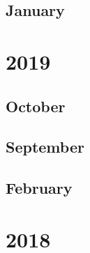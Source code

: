 \documentclass[12pt]{article}
\begin{document}
\subsection{January}
\begin{refsection}
    \nocite{raffel_exploring_2020}
    \nocite{kaplan2020scalinglawsneurallanguage}
    \printbibliography[heading=none]
\end{refsection}


\newpage
\section{2019}
\subsection{October}
\begin{refsection}
    \nocite{raffel_exploring_2020}
    \nocite{rajbhandari_zero_2020}
    \printbibliography[heading=none]
\end{refsection}

\subsection{September}
\begin{refsection}
    \nocite{shoeybi_megatron-lm_2020}
    \printbibliography[heading=none]
\end{refsection}


\subsection{February}
\begin{refsection}
    \nocite{Radford2019LanguageMA}
    \printbibliography[heading=none]
\end{refsection}


\newpage
\section{2018}
\end{document}

